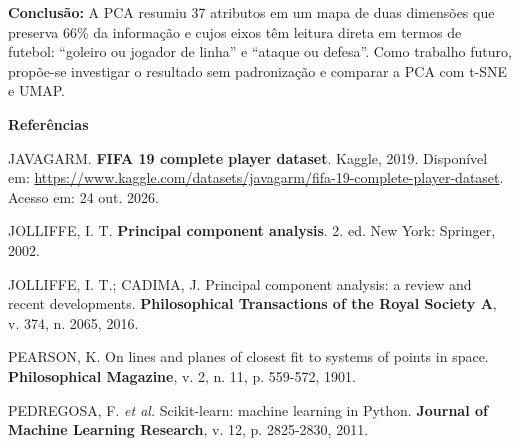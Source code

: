 \documentclass[10pt,oneside,a4paper,brazil]{abntex2}
\newcommand{\linhabranca}{\par\vspace{\baselineskip}}
\begin{document}
\linhabranca

\textbf{Conclusão:} A PCA resumiu 37 atributos em um mapa de duas dimensões
que preserva 66\% da informação e cujos eixos têm leitura direta em termos de
futebol: ``goleiro ou jogador de linha'' e ``ataque ou defesa''. Como trabalho futuro, propõe-se investigar o
resultado sem padronização e comparar a PCA com t-SNE e UMAP.

\linhabranca

\textbf{Referências}

\begin{flushleft}
JAVAGARM. \textbf{FIFA 19 complete player dataset}. Kaggle, 2019.
Disponível em:
\url{https://www.kaggle.com/datasets/javagarm/fifa-19-complete-player-dataset}.
Acesso em: 24 out. 2026.

\vspace{\baselineskip}

JOLLIFFE, I. T. \textbf{Principal component analysis}. 2. ed. New York:
Springer, 2002.

\vspace{\baselineskip}

JOLLIFFE, I. T.; CADIMA, J. Principal component analysis: a review and recent
developments. \textbf{Philosophical Transactions of the Royal Society A},
v. 374, n. 2065, 2016.

\vspace{\baselineskip}

PEARSON, K. On lines and planes of closest fit to systems of points in space.
\textbf{Philosophical Magazine}, v. 2, n. 11, p. 559-572, 1901.

\vspace{\baselineskip}

PEDREGOSA, F. \emph{et al.} Scikit-learn: machine learning in Python.
\textbf{Journal of Machine Learning Research}, v. 12, p. 2825-2830, 2011.
\end{flushleft}
\end{document}
